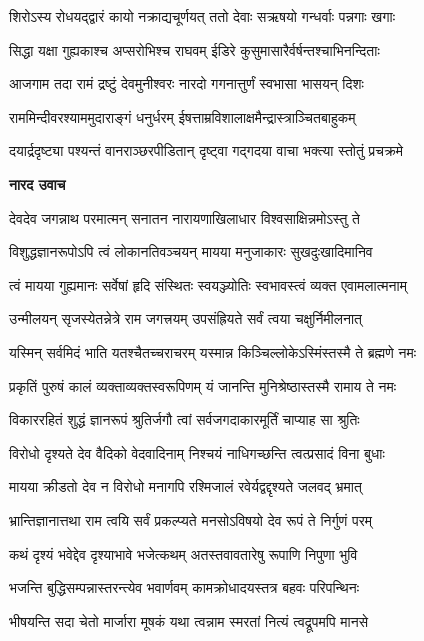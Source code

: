\twolineshloka
{शिरोऽस्य रोधयद्द्वारं कायो नक्राद्यचूर्णयत्}
{ततो देवाः सऋषयो गन्धर्वाः पन्नगाः खगाः} %

\twolineshloka
{सिद्धा यक्षा गुह्यकाश्च अप्सरोभिश्च राघवम्}
{ईडिरे कुसुमासारैर्वर्षन्तश्चाभिनन्दिताः} %

\twolineshloka
{आजगाम तदा रामं द्रष्टुं देवमुनीश्वरः}
{नारदो गगनात्तुर्णं स्वभासा भासयन् दिशः} %

\twolineshloka
{राममिन्दीवरश्याममुदाराङ्गं धनुर्धरम्}
{ईषत्ताम्रविशालाक्षमैन्द्रास्त्राञ्चितबाहुकम्} %

\twolineshloka
{दयार्द्रदृष्ट्या पश्यन्तं वानराञ्छरपीडितान्}
{दृष्ट्वा गद्गदया वाचा भक्त्या स्तोतुं प्रचक्रमे} %

\textbf{नारद उवाच}

\twolineshloka
{देवदेव जगन्नाथ परमात्मन् सनातन}
{नारायणाखिलाधार विश्वसाक्षिन्नमोऽस्तु ते} %

\twolineshloka
{विशुद्धज्ञानरूपोऽपि त्वं लोकानतिवञ्चयन्}
{मायया मनुजाकारः सुखदुःखादिमानिव} %

\twolineshloka
{त्वं मायया गुह्यमानः सर्वेषां हृदि संस्थितः}
{स्वयञ्ज्योतिः स्वभावस्त्वं व्यक्त एवामलात्मनाम्} %

\twolineshloka
{उन्मीलयन् सृजस्येतन्नेत्रे राम जगत्त्रयम्}
{उपसंह्रियते सर्वं त्वया चक्षुर्निमीलनात्} %

\twolineshloka
{यस्मिन् सर्वमिदं भाति यतश्चैतच्चराचरम्}
{यस्मान्न किञ्चिल्लोकेऽस्मिंस्तस्मै ते ब्रह्मणे नमः} %

\twolineshloka
{प्रकृतिं पुरुषं कालं व्यक्ताव्यक्तस्वरूपिणम्}
{यं जानन्ति मुनिश्रेष्ठास्तस्मै रामाय ते नमः} %

\twolineshloka
{विकाररहितं शुद्धं ज्ञानरूपं श्रुतिर्जगौ}
{त्वां सर्वजगदाकारमूर्तिं चाप्याह सा श्रुतिः} %

\twolineshloka
{विरोधो दृश्यते देव वैदिको वेदवादिनाम्}
{निश्चयं नाधिगच्छन्ति त्वत्प्रसादं विना बुधाः} %

\twolineshloka
{मायया क्रीडतो देव न विरोधो मनागपि}
{रश्मिजालं रवेर्यद्वद्दृश्यते जलवद् भ्रमात्} %

\twolineshloka
{भ्रान्तिज्ञानात्तथा राम त्वयि सर्वं प्रकल्प्यते}
{मनसोऽविषयो देव रूपं ते निर्गुणं परम्} %

\twolineshloka
{कथं दृश्यं भवेद्देव दृश्याभावे भजेत्कथम्}
{अतस्तवावतारेषु रूपाणि निपुणा भुवि} %

\twolineshloka
{भजन्ति बुद्धिसम्पन्नास्तरन्त्येव भवार्णवम्}
{कामक्रोधादयस्तत्र बहवः परिपन्थिनः} %

\twolineshloka
{भीषयन्ति सदा चेतो मार्जारा मूषकं यथा}
{त्वन्नाम स्मरतां नित्यं त्वद्रूपमपि मानसे} %

